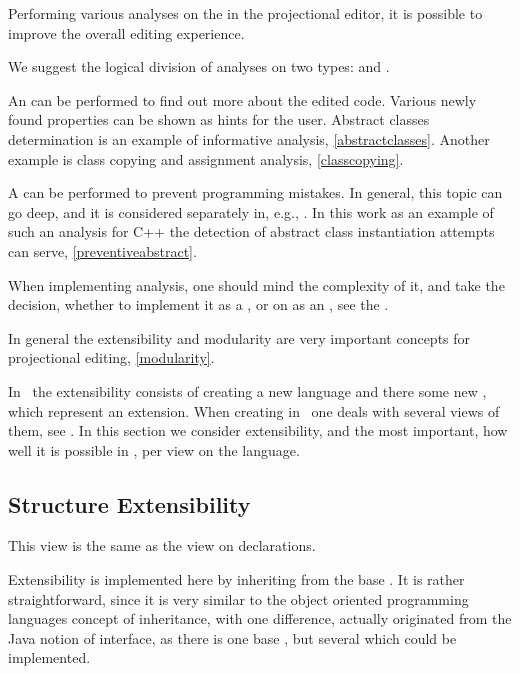 Performing various analyses on the  in the projectional editor, it is possible to improve the overall 
editing experience.

We suggest the logical division of analyses on two types:  and .

An  can be performed to find out more about the edited code. Various newly found properties
can be shown as hints for the user. Abstract classes determination is an example of informative analysis, \ref{abstractclasses}. Another example
is class copying and assignment analysis, \ref{classcopying}.

A  can be performed to prevent programming mistakes. In general, this topic can go deep, and it is considered separately in, e.g.,
\cite{2012_ratiu_modular_dsls_and_analyses}. In this work as an example of such an analysis for C++ the detection of abstract class instantiation
attempts can serve, \ref{preventiveabstract}.

When implementing analysis, one should mind the complexity of it, and take the decision, whether to implement it as a , or
on as an , see the .



In general the extensibility and modularity are very important concepts for projectional editing, \ref{modularity}.

In \jbmps\ the extensibility consists of creating a new language and there some new , which represent an extension.
When creating  in \jbmps\ one deals with several views of them, see . In this section we consider extensibility, and 
the most important, how well it is possible in \jbmps, per view on the language.

\subsection{Structure Extensibility}

This view is the same as the view on  declarations.

Extensibility is implemented here by inheriting from the base . It is rather straightforward, 
since it is very similar to the object oriented programming languages concept of inheritance, with one difference, 
actually originated from the Java notion of interface, as there is one base , but several 
which could be implemented.


